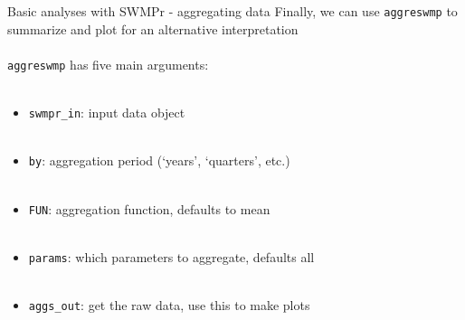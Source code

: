 \documentclass[xcolor=dvipsnames]{beamer}\usepackage[]{graphicx}\usepackage[]{color}
\begin{document}
\begin{frame}[containsverbatim]{Basic analyses with SWMPr - aggregating data}
Finally, we can use \texttt{aggreswmp} to summarize and plot for an alternative interpretation \\~\\
\texttt{aggreswmp} has five main arguments: \\~\\
\begin{itemize}
\item \texttt{swmpr\_in}: input data object \\~\\
\item \texttt{by}: aggregation period (`years', `quarters', etc.) \\~\\
\item \texttt{FUN}: aggregation function, defaults to mean \\~\\
\item \texttt{params}: which parameters to aggregate, defaults all \\~\\
\item \texttt{aggs\_out}: get the raw data, use this to make plots
\end{itemize}
\end{frame}
\end{document}
